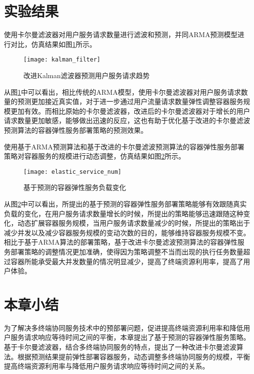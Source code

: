 

\section{实验结果}\label{sec:elastic_service_experiment_results}

使用卡尔曼滤波器对用户服务请求数量进行滤波和预测，并同ARMA预测模型进行对比，仿真结果如图\ref{fig:elastic_service_kalman_filter}所示。

\begin{figure}[!htbp]
    \centering
    \texttt{[image: kalman\_filter]}\hfill
  \caption{改进Kalman滤波器预测用户服务请求趋势}
  \label{fig:elastic_service_kalman_filter}
\end{figure}

从图\ref{fig:elastic_service_kalman_filter}中可以看出，相比传统的ARMA模型，使用卡尔曼滤波器对用户服务请求数量的预测更加接近真实值，对于进一步通过用户流量请求数量弹性调整容器服务规模更加有效。而相比原始的卡尔曼滤波器，改进后的卡尔曼滤波器对于增长的用户请求数量更加敏感，能够做出迅速的反应，这也有助于优化基于改进的卡尔曼滤波预测算法的容器弹性服务部署策略的预测效果。

使用基于ARMA预测算法和基于改进的卡尔曼滤波预测算法的容器弹性服务部署策略对容器服务的规模进行动态调整，仿真结果如图\ref{fig:elastic_service_num}所示。

\begin{figure}[!htbp]
    \centering
    \texttt{[image: elastic\_service\_num]}\hfill
  \caption{基于预测的容器弹性服务负载变化}
  \label{fig:elastic_service_num}
\end{figure}

从图\ref{fig:elastic_service_num}中可以看出，所提出的基于预测的容器弹性服务部署策略能够有效跟随真实负载的变化，在用户服务请求数量增长的时候，所提出的策略能够迅速跟随这种变化，动态扩展容器服务规模，当用户服务请求数量减少的时候，所提出的策略出于减少并发以及减少容器服务规模的变动次数的目的，能够维持容器服务规模不变。相比于基于ARMA算法的部署策略，基于改进卡尔曼滤波预测算法的容器弹性服务部署策略的调整情况更加准确，使得因为策略调整不当而出现的执行任务数量超过容器所能承受最大并发数量的情况明显减少，提高了终端资源利用率，提高了用户体验。

\section{本章小结}\label{sec:elastic_service_summary}

为了解决多终端协同服务技术中的预部署问题，促进提高终端资源利用率和降低用户服务请求响应等待时间之间的平衡，本章提出了基于预测的容器弹性服务策略。基于卡尔曼滤波器，结合多终端协同服务的特点，提出了一种改进卡尔曼滤波算法。根据预测结果提前弹性部署容器服务，动态调整多终端协同服务的规模，平衡提高终端资源利用率与降低用户服务请求响应等待时间之间的关系。